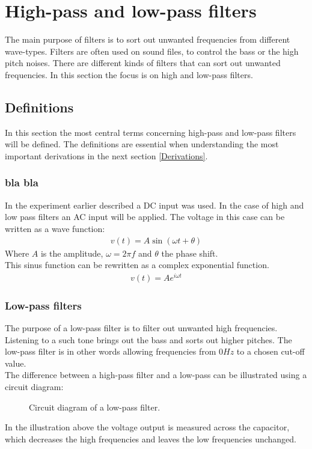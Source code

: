 \chapter{High-pass and low-pass filters}
The main purpose of filters is to sort out unwanted frequencies from different wave-types. Filters are often used on sound files, to control the bass or the high pitch noises. There are different kinds of filters that can sort out unwanted frequencies. In this section the focus is on high and low-pass filters.
\section{Definitions}
In this section the most central terms concerning high-pass and low-pass filters will be defined. The definitions are essential when understanding the most important derivations in the next section \ref{Derivations}.
\subsection{bla bla}
In the experiment earlier described a DC input was used. In the case of high and low pass filters an AC input will be applied. The voltage in this case can be written as a wave function:
\begin{align}
 v(t)=A\sin(\omega t+\theta)
 \end{align} 
Where $A$ is the amplitude, $\omega=2\pi f$ and $\theta$ the phase shift. 
\\
This sinus function can be rewritten as a complex exponential function.
\begin{align*}
v(t)=Ae^{i\omega t}
\end{align*}
\subsection{Low-pass filters}
The purpose of a low-pass filter is to filter out unwanted high frequencies. Listening to a such tone brings out the bass and sorts out higher pitches. The low-pass filter is in other words allowing frequencies from $0Hz$ to a chosen cut-off value. \\
The difference between a high-pass filter and a low-pass can be illustrated using a circuit diagram:
\begin{figure}[H]
	
	\caption{Circuit diagram of a low-pass filter.} \label{lp:diagram}
\end{figure} 
In the illustration above the voltage output is measured across the capacitor, which decreases the high frequencies and leaves the low frequencies unchanged.  
